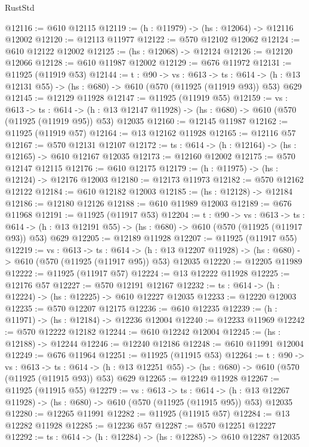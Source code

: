 \begin{lexlean}{RustStd}
\begin{coremodule}
@12116 := @610 @12115
@12119 := (h : @11979) -> (hs : @12064) -> @12116 @12002
@12120 := @12113 @11977
@12122 := @570 @12102 @12062
@12124 := @610 @12122 @12002
@12125 := (hs : @12068) -> @12124
@12126 := @12120 @12066
@12128 := @610 @11987 @12002
@12129 := @676 @11972
@12131 := @11925 (@11919 @53)
@12144 := {t : @90} ->
  {vs : @613} ->
  {ts : @614} -> (h : @13 @12131 @55) -> (hs : @680) -> @610 (@570 (@11925 (@11919 @93)) @53) @629
@12145 := @12129 @11928
@12147 := @11925 (@11919 @55)
@12159 := {vs : @613} ->
  {ts : @614} ->
  (h : @13 @12147 @11928) -> (hs : @680) -> @610 (@570 (@11925 (@11919 @95)) @53) @12035
@12160 := @12145 @11987
@12162 := @11925 (@11919 @57)
@12164 := @13 @12162 @11928
@12165 := @12116 @57
@12167 := @570 @12131 @12107
@12172 := {ts : @614} -> (h : @12164) -> (hs : @12165) -> @610 @12167 @12035
@12173 := @12160 @12002
@12175 := @570 @12147 @12115
@12176 := @610 @12175
@12179 := (h : @11975) -> (hs : @12124) -> @12176 @12003
@12180 := @12173 @11973
@12182 := @570 @12162 @12122
@12184 := @610 @12182 @12003
@12185 := (hs : @12128) -> @12184
@12186 := @12180 @12126
@12188 := @610 @11989 @12003
@12189 := @676 @11968
@12191 := @11925 (@11917 @53)
@12204 := {t : @90} ->
  {vs : @613} ->
  {ts : @614} -> (h : @13 @12191 @55) -> (hs : @680) -> @610 (@570 (@11925 (@11917 @93)) @53) @629
@12205 := @12189 @11928
@12207 := @11925 (@11917 @55)
@12219 := {vs : @613} ->
  {ts : @614} ->
  (h : @13 @12207 @11928) -> (hs : @680) -> @610 (@570 (@11925 (@11917 @95)) @53) @12035
@12220 := @12205 @11989
@12222 := @11925 (@11917 @57)
@12224 := @13 @12222 @11928
@12225 := @12176 @57
@12227 := @570 @12191 @12167
@12232 := {ts : @614} -> (h : @12224) -> (hs : @12225) -> @610 @12227 @12035
@12233 := @12220 @12003
@12235 := @570 @12207 @12175
@12236 := @610 @12235
@12239 := (h : @11971) -> (hs : @12184) -> @12236 @12004
@12240 := @12233 @11969
@12242 := @570 @12222 @12182
@12244 := @610 @12242 @12004
@12245 := (hs : @12188) -> @12244
@12246 := @12240 @12186
@12248 := @610 @11991 @12004
@12249 := @676 @11964
@12251 := @11925 (@11915 @53)
@12264 := {t : @90} ->
  {vs : @613} ->
  {ts : @614} -> (h : @13 @12251 @55) -> (hs : @680) -> @610 (@570 (@11925 (@11915 @93)) @53) @629
@12265 := @12249 @11928
@12267 := @11925 (@11915 @55)
@12279 := {vs : @613} ->
  {ts : @614} ->
  (h : @13 @12267 @11928) -> (hs : @680) -> @610 (@570 (@11925 (@11915 @95)) @53) @12035
@12280 := @12265 @11991
@12282 := @11925 (@11915 @57)
@12284 := @13 @12282 @11928
@12285 := @12236 @57
@12287 := @570 @12251 @12227
@12292 := {ts : @614} -> (h : @12284) -> (hs : @12285) -> @610 @12287 @12035

\end{coremodule}
\end{lexlean}
